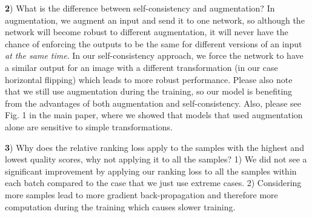 \documentclass[10pt,twocolumn,letterpaper]{article}
\begin{document}
\textbf{2}) What is the difference between self-consistency and augmentation?
In augmentation, we augment an input and send it to one network, so although the network will become robust to different augmentation, it will never have the chance of enforcing the outputs to be the same for different versions of an input \textit{at the same time}. In our self-consistency approach, we force the network to have a similar output for an image with a different transformation (in our case horizontal flipping) which leads to more robust performance. Please also note that we still use augmentation during the training, so our model is benefiting from the advantages of both augmentation and self-consistency. Also, please see Fig. 1 in the main paper, where we showed that models that used augmentation alone are sensitive to simple transformations.


\textbf{3}) Why does the relative ranking loss apply to the samples with the highest and lowest quality scores, why not applying it to all the samples?
1) We did not see a significant improvement by applying our ranking loss to all the samples within each batch compared to the case that we just use extreme cases. 
2) Considering more samples  lead to more gradient back-propagation and therefore more computation during the training which causes slower training.
\end{document}
